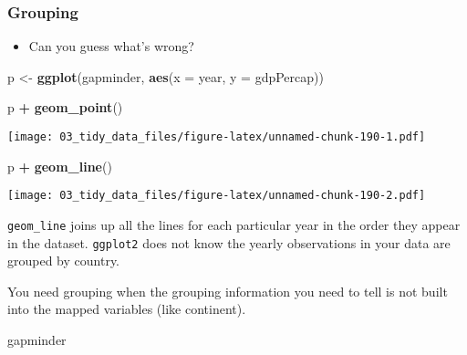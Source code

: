 \documentclass[
]{book}
\newenvironment{Shaded}{\begin{snugshade}}{\end{snugshade}}
\newcommand{\DataTypeTok}[1]{\textcolor[rgb]{0.13,0.29,0.53}{#1}}
\newcommand{\KeywordTok}[1]{\textcolor[rgb]{0.13,0.29,0.53}{\textbf{#1}}}
\newcommand{\NormalTok}[1]{#1}
\newcommand{\OperatorTok}[1]{\textcolor[rgb]{0.81,0.36,0.00}{\textbf{#1}}}
\newcommand{\StringTok}[1]{\textcolor[rgb]{0.31,0.60,0.02}{#1}}
\providecommand{\tightlist}{%
  \setlength{\itemsep}{0pt}\setlength{\parskip}{0pt}}
\begin{document}
\hypertarget{grouping-1}{%
\subsubsection{Grouping}\label{grouping-1}}

\begin{itemize}
\tightlist
\item
  Can you guess what's wrong?
\end{itemize}

\begin{Shaded}
\begin{Highlighting}[]
\NormalTok{p \textless{}{-}}\StringTok{ }\KeywordTok{ggplot}\NormalTok{(gapminder, }\KeywordTok{aes}\NormalTok{(}\DataTypeTok{x =}\NormalTok{ year, }\DataTypeTok{y =}\NormalTok{ gdpPercap))}

\NormalTok{p }\OperatorTok{+}\StringTok{ }\KeywordTok{geom\_point}\NormalTok{()}
\end{Highlighting}
\end{Shaded}

\texttt{[image: 03\_tidy\_data\_files/figure-latex/unnamed-chunk-190-1.pdf]}

\begin{Shaded}
\begin{Highlighting}[]
\NormalTok{p }\OperatorTok{+}\StringTok{ }\KeywordTok{geom\_line}\NormalTok{()}
\end{Highlighting}
\end{Shaded}

\texttt{[image: 03\_tidy\_data\_files/figure-latex/unnamed-chunk-190-2.pdf]}

\texttt{geom\_line} joins up all the lines for each particular year in the order they appear in the dataset. \texttt{ggplot2} does not know the yearly observations in your data are grouped by country.

You need grouping when the grouping information you need to tell is not built into the mapped variables (like continent).

\begin{Shaded}
\begin{Highlighting}[]
\NormalTok{gapminder}
\end{Highlighting}
\end{Shaded}
\end{document}
